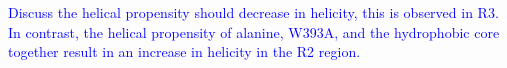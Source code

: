 \textcolor{blue}{Discuss the helical propensity should decrease in helicity, this is observed in R3. In contrast, the helical propensity of alanine, W393A, and the hydrophobic core together result in an increase in helicity in the R2 region. }